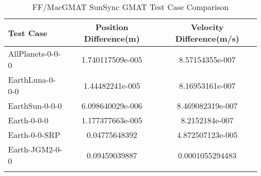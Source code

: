 \begin{table}[htbp!]
\centering
\caption{ FF/MacGMAT SunSync GMAT Test Case Comparison}
      \begin{tabular}{lcc}
      \hline\hline
          Test Case & Position Difference(m) & Velocity Difference(m/s) \\
         \hline
         AllPlanets-0-0-0 & 1.740117509e-005 & 8.57154355e-007 \\
         EarthLuna-0-0-0 & 1.44482241e-005 & 8.16953161e-007 \\
         EarthSun-0-0-0 & 6.098640029e-006 & 8.469082319e-007 \\
         Earth-0-0-0 & 1.177377663e-005 & 8.2152184e-007 \\
         Earth-0-0-SRP & 0.04775648392 & 4.872507123e-005 \\
         Earth-JGM2-0-0 & 0.09459039887 & 0.0001055294483 \\
      \hline\hline
      \label{Table: SunSync GMAT Table} 
\end{tabular}
\end{table}
